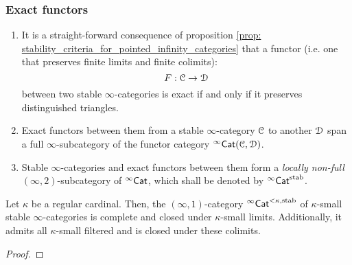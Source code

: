             \subsubsection{Exact functors}
                \begin{remark} \label{remark: functors_between_stable_infinity_categories}  
                    \noindent
                    \begin{enumerate}
                        \item It is a straight-forward consequence of proposition \ref{prop: stability_criteria_for_pointed_infinity_categories} that a functor (i.e. one that preserves finite limits and finite colimits):
                            $$F: \mathcal{C} \to \mathcal{D}$$
                        between two stable $\infty$-categories is exact if and only if it preserves distinguished triangles.
                        \item Exact functors between them from a stable $\infty$-category $\mathcal{C}$ to another $\mathcal{D}$ span a full $\infty$-subcategory of the functor category ${}^{\infty}\mathsf{Cat}(\mathcal{C}, \mathcal{D})$.
                        \item Stable $\infty$-categories and exact functors between them form a \textit{locally non-full} $(\infty, 2)$-subcategory of ${}^{\infty}\mathsf{Cat}$, which shall be denoted by ${}^{\infty}\mathsf{Cat}^{\mathrm{stab}}$. 
                    \end{enumerate}
                \end{remark}
                
                \begin{proposition} \label{prop: (co)limits_of_stable_infinity_categories}  
                    Let $\kappa$ be a regular cardinal. Then, the $(\infty, 1)$-category ${}^{\infty}\mathsf{Cat}^{< \kappa, \mathrm{stab}}$ of $\kappa$-small stable $\infty$-categories is complete and closed under $\kappa$-small limits. Additionally, it admits all $\kappa$-small filtered and is closed under these colimits. 
                \end{proposition}
                    \begin{proof}
                        
                    \end{proof}
    
